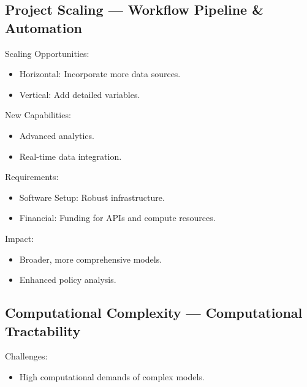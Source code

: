 \documentclass[
  letterpaper,
]{book}
\providecommand{\tightlist}{%
  \setlength{\itemsep}{0pt}\setlength{\parskip}{0pt}}
\begin{document}
\subsection{Project Scaling --- Workflow Pipeline \&
Automation}\label{project-scaling-workflow-pipeline-automation}

Scaling Opportunities:

\begin{itemize}
\tightlist
\item
  Horizontal: Incorporate more data sources.\\
\item
  Vertical: Add detailed variables.
\end{itemize}

New Capabilities:

\begin{itemize}
\tightlist
\item
  Advanced analytics.\\
\item
  Real-time data integration.
\end{itemize}

Requirements:

\begin{itemize}
\tightlist
\item
  Software Setup: Robust infrastructure.\\
\item
  Financial: Funding for APIs and compute resources.
\end{itemize}

Impact:

\begin{itemize}
\tightlist
\item
  Broader, more comprehensive models.\\
\item
  Enhanced policy analysis.
\end{itemize}

\subsection{Computational Complexity --- Computational
Tractability}\label{computational-complexity-computational-tractability}

Challenges:

\begin{itemize}
\tightlist
\item
  High computational demands of complex models.
\end{itemize}
\end{document}
